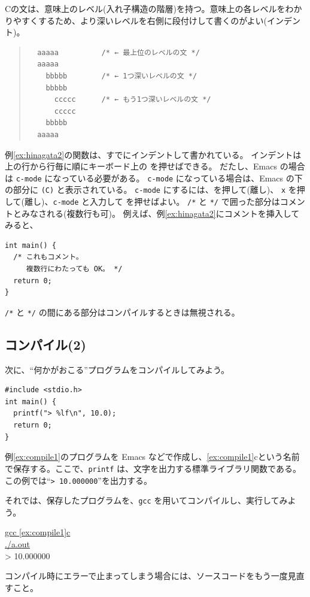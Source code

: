 Cの文は、意味上のレベル(入れ子構造の階層)を持つ。意味上の各レベルをわかりやすくするため、より深いレベルを右側に段付けして書くのがよい(インデント)。
\begin{quote}
\begin{verbatim}
  aaaaa          /* ← 最上位のレベルの文 */
  aaaaa
    bbbbb        /* ← 1つ深いレベルの文 */
    bbbbb
      ccccc      /* ← もう1つ深いレベルの文 */
      ccccc
    bbbbb
  aaaaa
\end{verbatim}
\end{quote}
例\ref{ex:hinagata2}の関数は、すでにインデントして書かれている。
インデントは上の行から行毎に順にキーボード上の \tabkey を押せばできる。
だたし、Emacs の場合は \verb+c-mode+ になっている必要がある。
\verb+c-mode+ になっている場合は、Emacs の下の部分に \verb+(C)+ と表示されている。
\verb+c-mode+ にするには、\esckey を押して(離し)、
\verb+x+ を押して(離し)、\verb+c-mode+ と入力して \ret を押せばよい。
\verb+/*+ と \verb+*/+ で囲った部分はコメントとみなされる(複数行も可)。
例えば、例\ref{ex:hinagata2}にコメントを挿入してみると、
\begin{reidai}
\begin{verbatim}
int main() {
  /* これもコメント。
     複数行にわたっても OK。 */
  return 0;
}
\end{verbatim}
\end{reidai} \noindent
\verb+/*+ と \verb+*/+ の間にある部分はコンパイルするときは無視される。

\subsection{コンパイル(2)}

次に、``何かがおこる''プログラムをコンパイルしてみよう。
\begin{reidai}\label{ex:compile1}
\begin{verbatim}
#include <stdio.h>
int main() {
  printf("> %lf\n", 10.0);
  return 0;
}
\end{verbatim}
\end{reidai} \noindent
例\ref{ex:compile1}のプログラムを Emacs などで作成し、\ref{ex:compile1}cという名前で保存する。ここで、\verb+printf+ は、文字を出力する標準ライブラリ関数である。この例では``\verb+> 10.000000+''を出力する。

それでは、保存したプログラムを、\verb+gcc+ を用いてコンパイルし、実行してみよう。
\begin{commandline2}
\prompt \underline{gcc \ref{ex:compile1}c} \\
\prompt \underline{./a.out} \\
> 10.000000
\end{commandline2} \noindent
コンパイル時にエラーで止まってしまう場合には、ソースコードをもう一度見直すこと。

